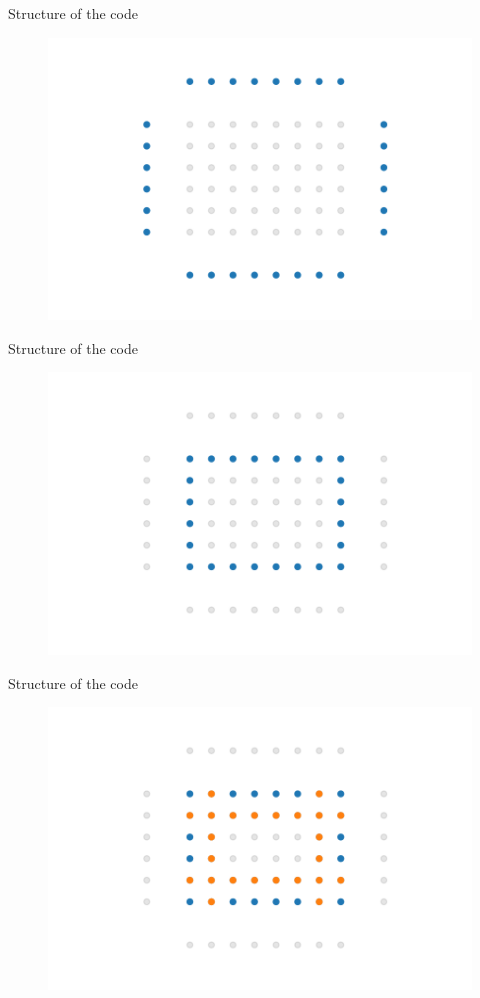 \documentclass{beamer}
\begin{document}

\begin{frame}{Structure of the code}
    \begin{figure}
        \centering
        \includegraphics[width=0.8\linewidth]{Figures/step1.pdf}
    \end{figure}
\end{frame}


\begin{frame}{Structure of the code}
    \begin{figure}
        \centering
        \includegraphics[width=0.8\linewidth]{Figures/step2.pdf}
    \end{figure}
\end{frame}


\begin{frame}{Structure of the code}
    \begin{figure}
        \centering
        \includegraphics[width=0.8\linewidth]{Figures/step3.pdf}
    \end{figure}
\end{frame}
\end{document}
